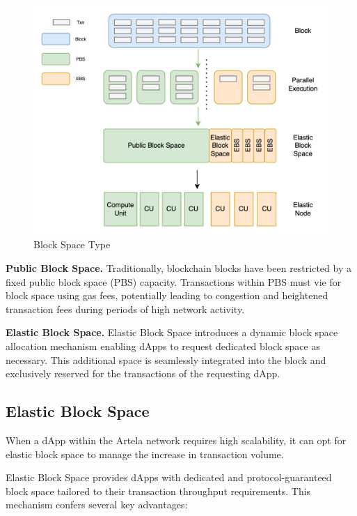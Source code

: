 \begin{figure}[htp]
\centering
\includegraphics[width=\columnwidth]{sections/images/elastic-block-space.png}
\caption{Block Space Type}
\end{figure}

\textbf{Public Block Space.} Traditionally, blockchain blocks have been restricted by a fixed public block space (PBS) capacity. Transactions within PBS must vie for block space using gas fees, potentially leading to congestion and heightened transaction fees during periods of high network activity.

\textbf{Elastic Block Space.} Elastic Block Space introduces a dynamic block space allocation mechanism enabling dApps to request dedicated block space as necessary. This additional space is seamlessly integrated into the block and exclusively reserved for the transactions of the requesting dApp.

\subsection{Elastic Block Space}

When a dApp within the Artela network requires high scalability, it can opt for elastic block space to manage the increase in transaction volume.

Elastic Block Space provides dApps with dedicated and protocol-guaranteed block space tailored to their transaction throughput requirements. This mechanism confers several key advantages:

